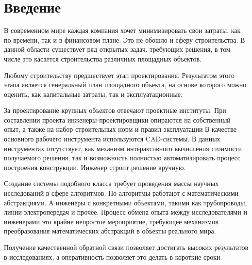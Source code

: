 \section*{\Large{Введение}}
В современном мире каждая компания хочет минимизировать свои затраты, как по времени, так и в финансовом плане.
Это не обошло и сферу строительства.
В данной области существует ряд открытых задач, требующих решения,
в том числе это касается строительства различных площадных объектов.

Любому строительству предшествует этап проектирования.
Результатом этого этапа является генеральный план площадного объекта,
на основе которого можно оценить, как капитальные затраты, так и эксплуатационные.

За проектирование крупных объектов отвечают проектные институты.
При составлении проекта инженеры-проектировщики опираются на собственный опыт, а также на набор строительных норм
и правил эксплуатации
В качестве основного рабочего инструмента используются CAD-системы.
В данных инструментах отсутствует, как механизм интерактивного вычисления стоимости получаемого решения,
так и возможность полностью автоматизировать процесс построения конструкции. Инженер строит решение вручную.


Создание системы подобного класса требует проведения массы научных исследований в сфере алгоритмов.
Но алгоритмы работают с математическими абстракциями.
А инженеры с конкретными объектами, такими как трубопроводы, линии электропередач и прочее.
Процесс обмена опыта между исследователями и инженерами это крайне непростое мероприятие,
требующее механизмов преобразования математических абстракций в объекты реального мира.

Получение качественной обратной связи позволяет достигать высоких результатов в исследованиях, а оперативность
позволяет это делать в короткие сроки.
